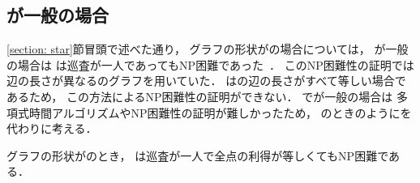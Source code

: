 \subsection{{\maxIdletime}が一般の場合}
\ref{section: star}節冒頭で述べた通り，
グラフの形状が{\graphStar}の場合については，
{\maxIdletime}が一般の場合は
{\patProb}は巡査が一人であってもNP困難であった~\cite[Theorem~6]{coene2011charlemagne}．
このNP困難性の証明では
辺の長さが異なる{\graphStar}のグラフを用いていた．
{\graphUnit}は{\graphStar}の辺の長さがすべて等しい場合であるため，
この方法によるNP困難性の証明ができない．
{\graphUnit}で{\maxIdletime}が一般の場合は
多項式時間アルゴリズムやNP困難性の証明が難しかったため，
{\graphLine}のときのように{\timeSpecifiedPatProb}を代わりに考える．


\begin{theo}
\label{theo:unit_exacidletime_NPhard}
グラフの形状が{\graphUnit}のとき，
{\timeSpecifiedPatProb}は巡査が一人で全点の利得が等しくてもNP困難である．
\end{theo}
